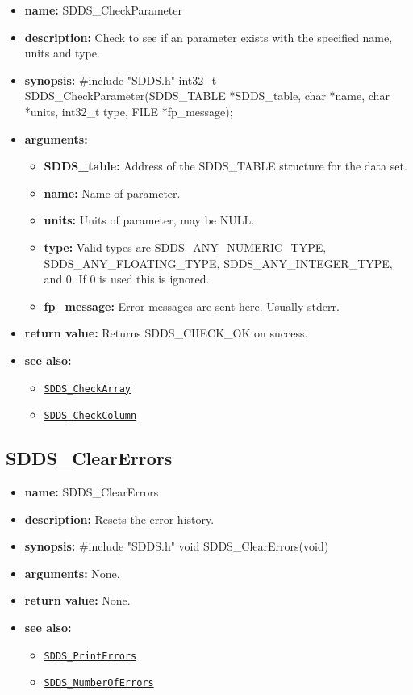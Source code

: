 \documentclass[11pt]{article}
\newcommand{\progref}[1]{\hyperref[SDDS_#1]{\tt SDDS\_#1}}
\begin{document}
\begin{itemize}
\item {\bf name:}\newline
SDDS\_CheckParameter
\item {\bf description:}\newline
Check to see if an parameter exists with the specified name, units and type.
\item {\bf synopsis:} \#include "SDDS.h"\newline
int32\_t SDDS\_CheckParameter(SDDS\_TABLE *SDDS\_table, char *name, char *units, int32\_t type, FILE *fp\_message);
\item {\bf arguments:}
\begin{itemize}
\item {\bf SDDS\_table:} Address of the SDDS\_TABLE structure for the data set.
\item {\bf name:} Name of parameter.
\item {\bf units:} Units of parameter, may be NULL.
\item {\bf type:} Valid types are SDDS\_ANY\_NUMERIC\_TYPE, SDDS\_ANY\_FLOATING\_TYPE, SDDS\_ANY\_INTEGER\_TYPE, and 0. If 0 is used this is ignored.
\item {\bf fp\_message:} Error messages are sent here. Usually stderr.
\end{itemize}
\item {\bf return value:}\newline
Returns SDDS\_CHECK\_OK on success.
\item {\bf see also:}
\begin{itemize}
\item \progref{CheckArray}
\item \progref{CheckColumn}
\end{itemize}
\end{itemize}

\subsection{SDDS\_ClearErrors}
\label{SDDS_ClearErrors}

\begin{itemize}
\item {\bf name:}\newline
SDDS\_ClearErrors
\item {\bf description:}\newline
Resets the error history.
\item {\bf synopsis:} \#include "SDDS.h"\newline
void SDDS\_ClearErrors(void)
\item {\bf arguments:}\newline
None.
\item {\bf return value:}\newline
None.
\item {\bf see also:}
\begin{itemize}
\item \progref{PrintErrors}
\item \progref{NumberOfErrors}
\end{itemize}
\end{itemize}
\end{document}

